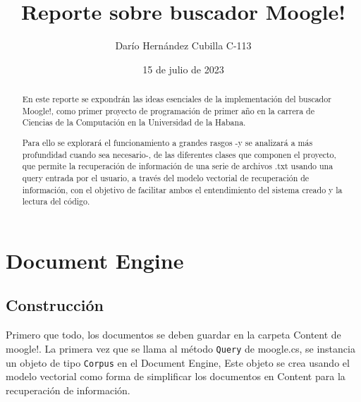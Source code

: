 \documentclass[a4paper, 12pt]{article}
\begin{document}
\title{Reporte sobre buscador Moogle!}
\author{Darío Hernández Cubilla C-113}
\date{15 de julio de 2023}
\maketitle

\tableofcontents

\begin{abstract}
        
    En este reporte se expondrán las ideas esenciales de la implementación del buscador Moogle!, como primer proyecto de programación de primer
    año en la carrera de Ciencias de la Computación en la Universidad de la Habana.

    Para ello se explorará el funcionamiento a grandes rasgos -y se analizará a más profundidad cuando sea necesario-, de las diferentes clases 
    que componen el proyecto, que permite la recuperación de información de una serie de archivos .txt usando una query entrada por el usuario,
    a través del modelo vectorial de recuperación de información, con el objetivo de facilitar ambos el entendimiento del sistema creado y la
    lectura del código.

\end{abstract}


\section{Document Engine}

\subsection{Construcción}

Primero que todo, los documentos se deben guardar en la carpeta Content de moogle!. La primera
vez que se llama al método \texttt{Query} de moogle.cs, se instancia un objeto de tipo
\texttt{Corpus} en el Document Engine, Este objeto se crea usando el modelo vectorial como forma
de simplificar los documentos en Content para la recuperación de información.
\end{document}
